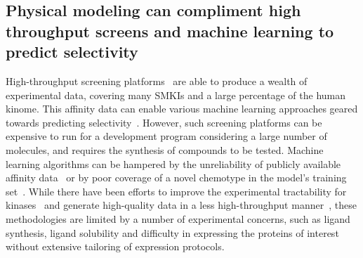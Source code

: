 \documentclass[phd,tocprelim]{cornell}
\begin{document}
\subsection{Physical modeling can compliment high throughput screens and machine learning to predict selectivity}
High-throughput screening platforms~\citep{Davis:Nat.Biotechnol.:2011,Drewry2017-bd,Cheng2010-ip,Uitdehaag2012-nm,Klaeger2017-jr,Vasta:2018gy} are able to produce a wealth of experimental data, covering many SMKIs and a large percentage of the human kinome. This affinity data can enable various machine learning approaches geared towards predicting selectivity~\citep{Merget2017-sv,Volkamer2016-sj,ChristmannFranck:2016gka,Gao:2013jx}. However, such screening platforms can be expensive to run for a development program considering a large number of molecules, and requires the synthesis of compounds to be tested. Machine learning algorithms can be hampered by the unreliability of publicly available affinity data~\citep{Kramer:J.Med.Chem.:2012,BROWN2009420} or by poor coverage of a novel chemotype in the model's training set~\citep{Drewry2017-bd}. While there have been efforts to improve the experimental tractability for kinases~\citep{Albanese:2018hq,Seeliger:2005ic,sgc-kinome,Chambers:2004jc} and generate high-quality data in a less high-throughput manner~\citep{Seeliger2007-jn,Levinson:PLoSBiol.:2006}, these methodologies are limited by a number of experimental concerns, such as ligand synthesis, ligand solubility and difficulty in expressing the proteins of interest without extensive tailoring of expression protocols. 
\end{document}
